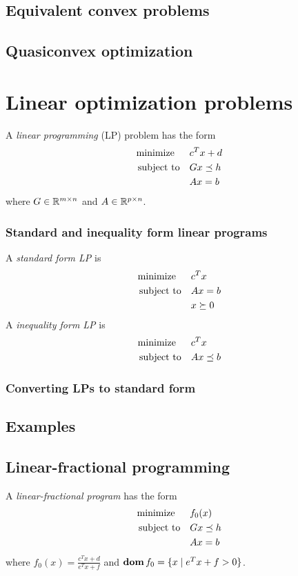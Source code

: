 \subsection{Equivalent convex problems}

\subsection{Quasiconvex optimization}

\section{Linear optimization problems}
A \textit{linear programming} (LP) problem has the form
\begin{align}
  \text{minimize\;\;}\quad& c^Tx+d\nonumber\\
  \text{subject to}  \quad& Gx\preceq h\label{eq:4.27}\\
                          & Ax=b\nonumber
\end{align}
where $G\in\mathbb{R}^{m\times n}$ and $A\in\mathbb{R}^{p\times n}$.
\subsubsection{Standard and inequality form linear programs}
A \textit{standard form LP} is
\begin{align}
  \text{minimize\;\;}\quad& c^Tx\nonumber\\
  \text{subject to}  \quad& Ax=b\label{eq:4.28}\\
                          & x\succeq 0\nonumber
\end{align}
A \textit{inequality form LP} is
\begin{align}
  \text{minimize\;\;}\quad& c^Tx\nonumber\\
  \text{subject to}  \quad& Ax\preceq b\label{eq:4.29}
\end{align}
\subsubsection{Converting LPs to standard form}

\subsection{Examples}

\subsection{Linear-fractional programming}
A \textit{linear-fractional program} has the form
\begin{align}
  \text{minimize\;\;}\quad& f_0(x)\nonumber\\
  \text{subject to}  \quad& Gx\preceq h\label{eq:4.32}\\
                          & Ax=b\nonumber
\end{align}
where $f_0(x)=\frac{c^Tx+d}{e^Tx+f}$ and $\mathop{\bf dom} f_0=\{x\mid e^Tx+f>0\}$.
\begin{example}
\end{example}

